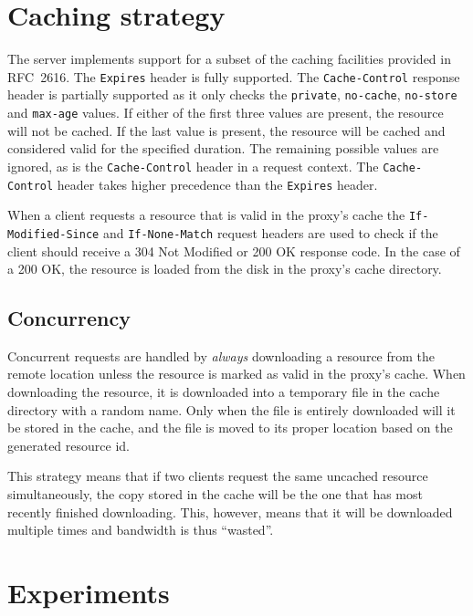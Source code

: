 \documentclass{sig-alternate}
\begin{document}
\section{Caching strategy}
\label{sec:cachestrategy}

The server implements support for a subset of the caching facilities
provided in RFC~2616. The \verb+Expires+ header is fully supported. The
\verb+Cache-Control+ response header is partially supported as it only checks
the \verb+private+, \verb+no-cache+, \verb+no-store+ and \verb+max-age+
values. If either of the first three values are present, the resource will
not be cached. If the last value is present, the resource will be cached and
considered valid for the specified duration. The remaining possible values
are ignored, as is the \verb+Cache-Control+ header in a request context. The
\verb+Cache-Control+ header takes higher precedence than the \verb+Expires+
header.

When a client requests a resource that is valid in the proxy's cache the
\verb+If-Modified-Since+ and \verb+If-None-Match+ request headers are used to
check if the client should receive a 304 Not Modified or 200 OK response code.
In the case of a 200 OK, the resource is loaded from the disk in the proxy's
cache directory.

\subsection{Concurrency}
\label{sec:concurrency}

Concurrent requests are handled by \emph{always} downloading a resource from
the remote location unless the resource is marked as valid in the proxy's
cache. When downloading the resource, it is downloaded into a temporary file
in the cache directory with a random name. Only when the file is entirely
downloaded will it be stored in the cache, and the file is moved to its proper
location based on the generated resource id.

This strategy means that if two clients request the same uncached resource
simultaneously, the copy stored in the cache will be the one that has most
recently finished downloading. This, however, means that it will be downloaded
multiple times and bandwidth is thus ``wasted''.


\section{Experiments}
\label{sec:experiments}
\end{document}

